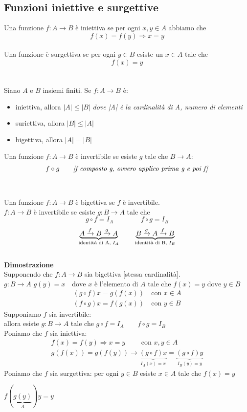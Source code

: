\documentclass[italian]{article}
\begin{document}
\subsection{Funzioni iniettive e surgettive}
Una funzione $f:A\to B$ è iniettiva se per ogni $x,y \in A$ abbiamo che
\[
	f(x)=f(y)\Rightarrow x=y
\] \\
Una funzione è surgettiva se per ogni $y\in B$ esiste un $x\in A$ tale che
\[
	f(x)=y
\] \\\\
Siano $A$ e $B$ insiemi finiti. Se $f: A\to B$ è:
\begin{itemize}
	\item iniettiva, allora $|A|\leq|B|$ \qquad \emph{dove |A| è la cardinalità di A, numero di elementi}
	\item suriettiva, allora $|B|\leq |A|$
	\item bigettiva, allora $|A|=|B|$
\end{itemize}
Una funzione $f:A\to B$ è invertibile se esiste $g$ tale che $B\to A$: 
\[
	f\circ g \qquad \text{\emph{[f composto g, ovvero applico prima g e poi f]}}
\] \\\\
Una funzione $f:A\to B$ è bigettiva se $f$ è invertibile.\\
$f:A\to B$ è invertibile se esiste $g: B\to A$ tale che
\[
	g\circ f = I_A \qquad \qquad f\circ g = I_B 
\]
\[
	\underbrace{A \xrightarrow[]{f} B \xrightarrow[]{g} A}_{
		\text{identità di A, $I_A$}} \text{\qquad}	
	\underbrace{B\xrightarrow[]{g} A \xrightarrow[]{f} B}_{
		\text{identità di B, $I_B$}}
\]
\pagebreak \\
\textbf{Dimostrazione}\\
Supponendo che $f:A\to B$ sia bigettiva [stessa cardinalità].\\
$g: B\to A$ \qquad $g(y)=x \quad \text{dove } x \text{ è l'elemento di } A \text{ tale che } f(x)=y \text{ dove } y\in B$ 
\begin{gather*}
	(g\circ f)x = g(f(x)) \quad \text{con } x\in A \\
	(f\circ g)x = f(g(x)) \quad \text{con } y\in B
\end{gather*}
Supponiamo $f$ sia invertibile:\\
allora esiste $g: B \to A$ tale che $g\circ f=I_A \qquad f\circ g = I_B$\\
Poniamo che $f$ sia iniettiva:
\begin{gather*}
	f(x) = f(y) \Rightarrow x=y \qquad \text{ con } x,y \in A \\
	g(f(x))=g(f(y)) \to \underbrace{(g\circ f)x}_{I_A(x)=x} = \underbrace{(g\circ f)y}_{I_B(y)=y}
\end{gather*}
Poniamo che $f$ sia surgettiva: per ogni $y\in B$ esiste $x\in A$ tale che $f(x)=y$\\
\begin{center}
	$f(\underbrace{g(y)}_{A})y=y$
\end{center}
\pagebreak
\end{document}
